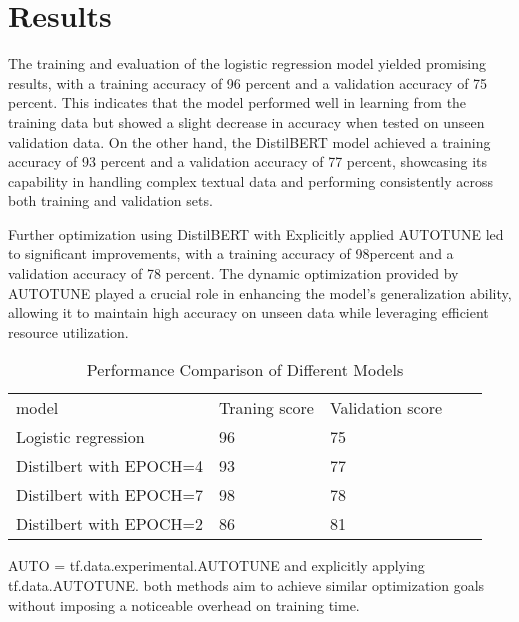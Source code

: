 \chapter{Results}

The training and evaluation of the logistic regression model yielded promising results, with a training accuracy of 96 percent and a validation accuracy of 75 percent. This indicates that the model performed well in learning from the training data but showed a slight decrease in accuracy when tested on unseen validation data. On the other hand, the DistilBERT model achieved a training accuracy of 93 percent and a validation accuracy of 77 percent, showcasing its capability in handling complex textual data and performing consistently across both training and validation sets.

Further optimization using DistilBERT with Explicitly applied AUTOTUNE led to significant improvements, with a training accuracy of 98percent and a validation accuracy of 78 percent. The dynamic optimization provided by AUTOTUNE played a crucial role in enhancing the model's generalization ability, allowing it to maintain high accuracy on unseen data while leveraging efficient resource utilization.
\label{ch:results}
\begin{table}[ht]
\caption{Performance Comparison of Different Models}
\begin{tabular}{lllll}

model                           & Traning score & Validation score \\
Logistic regression             & 96            & 75              &  \\
Distilbert with EPOCH=4 & 93            & 77                      &  \\
Distilbert with EPOCH=7 & 98            & 78                      &  \\
Distilbert with EPOCH=2 & 86           & 81                      &  \\

\end{tabular}
\end{table}

AUTO = tf.data.experimental.AUTOTUNE and explicitly applying tf.data.AUTOTUNE.
both methods aim to achieve similar optimization goals without imposing a noticeable overhead on training time.